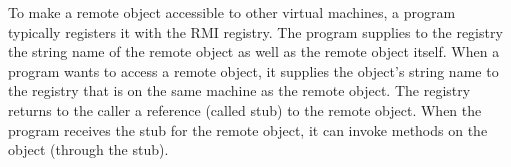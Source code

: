 To make a remote object accessible to other virtual machines, a program typically registers it with the RMI registry. The program supplies to the registry the string name of the remote object as well as the remote object itself. When a program wants to access a remote object, it supplies the object's string name to the registry that is on the same machine as the remote object. The registry returns to the caller a reference (called stub) to the remote object. When the program receives the stub for the remote object, it can invoke methods on the object (through the stub). 